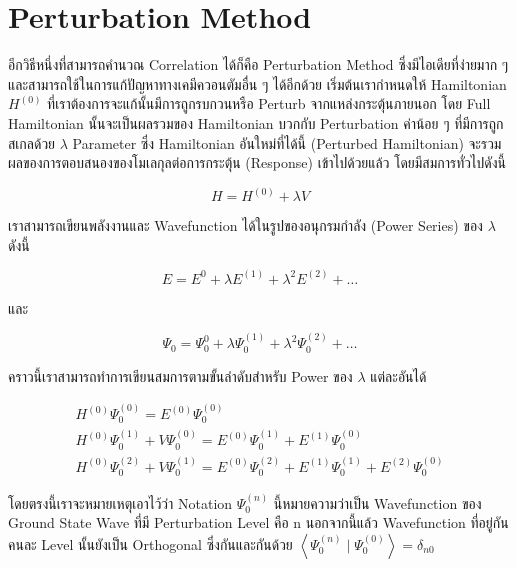 \section{Perturbation Method}

อีกวิธีหนึ่งที่สามารถคำนวณ Correlation ได้ก็คือ Perturbation Method ซึ่งมีไอเดียที่ง่ายมาก ๆ
และสามารถใช้ในการแก้ปัญหาทางเคมีควอนตัมอื่น ๆ ได้อีกด้วย เริ่มต้นเรากำหนดให้ Hamiltonian
$H^{(0)}$ ที่เราต้องการจะแก้นั้นมีการถูกรบกวนหรือ Perturb จากแหล่งกระตุ้นภายนอก โดย Full
Hamiltonian นั้นจะเป็นผลรวมของ Hamiltonian บวกกับ Perturbation ค่าน้อย ๆ
ที่มีการถูกสเกลด้วย $\lambda$ Parameter ซึ่ง Hamiltonian อันใหม่ที่ได้นี้ (Perturbed Hamiltonian) 
จะรวมผลของการตอบสนองของโมเลกุลต่อการกระตุ้น (Response) เข้าไปด้วยแล้ว โดยมีสมการทั่วไปดังนี้

\begin{equation}
    H = H^{(0)} + \lambda V
\end{equation}

เราสามารถเขียนพลังงานและ Wavefunction ได้ในรูปของอนุกรมกำลัง (Power Series)
ของ $\lambda$ ดังนี้

\begin{equation}
    E = E^{0} + \lambda E^{(1)} + \lambda^{2} E^{(2)} + \dots
\end{equation}

\noindent และ

\begin{equation}
    \Psi_{0} = \Psi_{0}^{0} + \lambda \Psi_{0}^{(1)}
    + \lambda^{2} \Psi_{0}^{(2)} + \dots
\end{equation}

คราวนี้เราสามารถทำการเขียนสมการตามขั้นลำดับสำหรับ Power ของ $\lambda$ แต่ละอันได้

\begin{gather}
    H^{(0)} \Psi_0^{(0)} = E^{(0)} \Psi_0^{(0)} \\
    H^{(0)} \Psi_0^{(1)}+V \Psi_0^{(0)}
    = E^{(0)} \Psi_0^{(1)}+E^{(1)} \Psi_0^{(0)} \\
    H^{(0)} \Psi_0^{(2)}+V \Psi_0^{(1)}
    = E^{(0)} \Psi_0^{(2)}+E^{(1)} \Psi_0^{(1)}+E^{(2)} \Psi_0^{(0)}
\end{gather}

โดยตรงนี้เราจะหมายเหตุเอาไว้ว่า Notation $\Psi_0^{(n)}$ นี้หมายความว่าเป็น Wavefunction
ของ Ground State Wave ที่มี Perturbation Level คือ $\mathrm{n}$
นอกจากนี้แล้ว Wavefunction ที่อยู่กันคนละ Level นั้นยังเป็น Orthogonal ซึ่งกันและกันด้วย
$\left\langle\Psi_0^{(n)} \mid \Psi_0^{(0)}\right\rangle = \delta_{n 0}$

